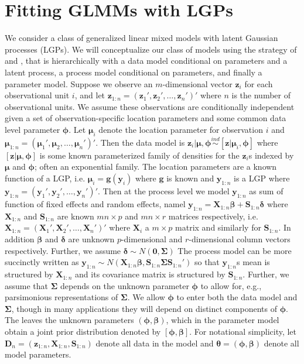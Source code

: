 \documentclass[12pt]{article}
\begin{document}
\section{Fitting GLMMs with LGPs}\label{sec:glm}
We consider a class of generalized linear mixed models \citep[GLMMs;][]{stroup2012generalized} with latent Gaussian processes (LGPs). We will conceptualize our class of models using the strategy of \citet{berliner1996hierarchical} and \citet{wikle2003hierarchical}, that is hierarchically with a data model conditional on parameters and a latent process, a process model conditional on parameters, and finally a parameter model. Suppose we observe an $m$-dimensional vector $\bm{z}_i$ for each observational unit $i$, and let $\bm{z}_{1:n} = (\bm{z}_1', \bm{z}_2', \dots, \bm{z}_n')'$ where $n$ is the number of observational units. We assume these observations are conditionally independent given a set of observation-specific location parameters and some common data level parameter $\bm{\phi}$. Let $\bm{\mu}_i$ denote the location parameter for observation $i$ and $\bm{\mu}_{1:n} = (\bm{\mu}_1', \bm{\mu}_2, \dots, \bm{\mu}_n')'$. Then the data model is $\bm{z}_i|\bm{\mu}, \bm{\phi} \stackrel{ind}{\sim} [\bm{z}|\bm{\mu}_i,\bm{\phi}]$ where $[\bm{z}|\bm{\mu},\bm{\phi}]$ is some known parameterized family of densities for the $\bm{z}_i$s indexed by $\bm{\mu}$ and $\bm{\phi}$; often an exponential family. The location parameters are a known function of a LGP, i.e. $\bm{\mu}_i = \bm{g}(\bm{y}_i)$ where $\bm{g}$ is known and $\bm{y}_{1:n}$ is a LGP where $\bm{y}_{1:n} = (\bm{y}_1', \bm{y}_2', \dots, \bm{y}_n')'$. Then at the process level we model $\bm{y}_{1:n}$ as sum of function of fixed effects and random effects, namel $\bm{y}_{1:n} = \bm{X}_{1:n}\bm{\beta} + \bm{S}_{1:n}\bm{\delta}$ where $\bm{X}_{1:n}$ and $\bm{S}_{1:n}$ are known $mn\times p$ and $mn\times r$ matrices respectively, i.e. $\bm{X}_{1:n} = (\bm{X}_1', \bm{X}_2', \dots, \bm{X}_n')'$ where $\bm{X}_i$ a $m\times p$ matrix and similarly for $\bm{S}_{1:n}$. In addition $\bm{\beta}$ and $\bm{\delta}$ are unknown $p$-dimensional and $r$-dimensional column vectors respectively. Further, we assume $\bm{\delta} \sim N(\bm{0}, \bm{\Sigma})$ The process model can be more succinctly written as $\bm{y}_{1:n} \sim N(\bm{X}_{1:n}\bm{\beta}, \bm{S}_{1:n}\bm{\Sigma}\bm{S}_{1:n}')$ so that $\bm{y}_{1:n}$s mean is structured by $\bm{X}_{1:n}$ and its covariance matrix is structured by $\bm{S}_{1:n}$. Further, we assume that $\bm{\Sigma}$ depends on the unknown parameter $\bm{\phi}$ to allow for, e.g., parsimonious representations of $\bm{\Sigma}$. We allow $\bm{\phi}$ to enter both the data model and $\bm{\Sigma}$, though in many applications they will depend on distinct components of $\bm{\phi}$. The leaves the unknown parameters $(\bm{\phi}, \bm{\beta})$, which in the parameter model obtain a joint prior distribution denoted by $[\bm{\phi}, \bm{\beta}]$. For notational simplicity, let $\bm{D}_n = (\bm{z}_{1:n}, \bm{X}_{1:n}, \bm{S}_{1:n})$ denote all data in the model and $\bm{\theta} = (\bm{\phi}, \bm{\beta})$ denote all model parameters.
\end{document}
